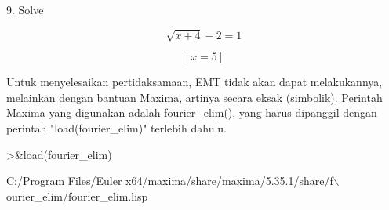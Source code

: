 \documentclass[a4paper,10pt]{article}
\begin{document}
\begin{eulernotebook}
\begin{eulercomment}
\begin{eulercomment}
\begin{eulercomment}
\begin{eulercomment}
\begin{eulerformula}
\[\]
\end{eulerformula}
\begin{eulercomment}
9. Solve\\
\end{eulercomment}
\begin{eulerformula}
\[
\sqrt{x+4}-2=1
\]
\end{eulerformula}
\begin{eulerformula}
\[
\left[ x=5 \right] 
\]
\end{eulerformula}
\begin{eulercomment}
Untuk menyelesaikan pertidaksamaan, EMT tidak akan dapat melakukannya,
melainkan dengan bantuan Maxima, artinya secara eksak (simbolik).
Perintah Maxima yang digunakan adalah fourier\_elim(), yang harus
dipanggil dengan perintah "load(fourier\_elim)" terlebih dahulu.
\end{eulercomment}
\begin{eulerprompt}
>&load(fourier_elim)
\end{eulerprompt}
\begin{euleroutput}
  
          C:/Program Files/Euler x64/maxima/share/maxima/5.35.1/share/f\(\backslash\)
  ourier_elim/fourier_elim.lisp
  

\end{euleroutput}
\end{eulercomment}
\end{eulercomment}
\end{eulercomment}
\end{eulercomment}
\end{eulernotebook}
\end{document}

